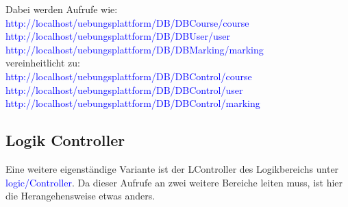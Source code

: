 \documentclass[10pt,a4paper,final,parskip]{scrartcl}
\newcommand{\blau}[1]{\textcolor{blue}{#1}}
\begin{document}
Dabei werden Aufrufe wie:\\
\blau{http://localhost/uebungsplattform/DB/DBCourse/course}\\
\blau{http://localhost/uebungsplattform/DB/DBUser/user}\\
\blau{http://localhost/uebungsplattform/DB/DBMarking/marking}\\

vereinheitlicht zu:\\
\blau{http://localhost/uebungsplattform/DB/DBControl/course}\\
\blau{http://localhost/uebungsplattform/DB/DBControl/user}\\
\blau{http://localhost/uebungsplattform/DB/DBControl/marking}\\

\subsection{Logik Controller}
Eine weitere eigenständige Variante ist der LController des Logikbereichs unter \blau{logic/Controller}. Da dieser Aufrufe an zwei weitere Bereiche leiten muss, ist hier die Herangehensweise etwas anders.


\end{document}
